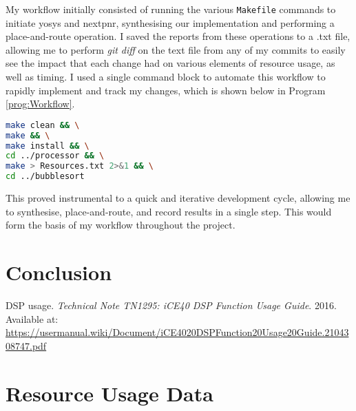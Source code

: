 \documentclass[a4paper,10pt]{article}
\begin{document}
My workflow initially consisted of running the various \texttt{Makefile}
commands to initiate yosys and nextpnr, 
synthesising our implementation and performing a place-and-route operation.
I saved the reports from these operations to a .txt file, 
allowing me to perform \textit{git diff} on the text file 
from any of my commits to easily see the impact that each change had 
on various elements of resource usage, as well as timing.
I used a single command block to automate this workflow 
to rapidly implement and track my changes, 
which is shown below in Program \ref{prog:Workflow}.

\begin{lstlisting}[language=bash,
    caption={Workflow used to synthesise and record results},
    label={prog:Workflow}]
make clean && \
make && \
make install && \
cd ../processor && \
make > Resources.txt 2>&1 && \
cd ../bubblesort
\end{lstlisting}

This proved instrumental to a quick and iterative development cycle, 
allowing me to synthesise, place-and-route, and record results in a single step.
This would form the basis of my workflow throughout the project.


\section{Conclusion}
\label{sec:Conclusion}

\begin{thebibliography}{9}

\bibitem{DSP_guide}
DSP usage. \textit{Technical Note TN1295: iCE40 DSP Function Usage Guide}. 
2016. Available at: 
\url{https://usermanual.wiki/Document/iCE4020DSPFunction20Usage20Guide.2104308747.pdf}

\end{thebibliography}

\newpage
\appendix
\section{Resource Usage Data}
\end{document}
